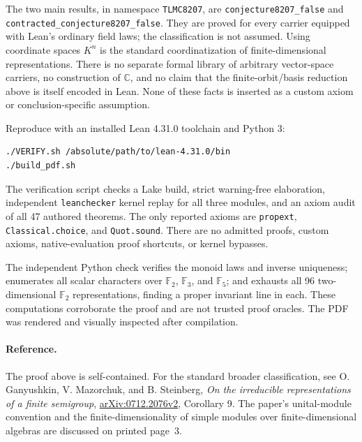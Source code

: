 \documentclass[11pt]{article}
\newcommand{\C}{\mathbb C}
\begin{document}
The two main results, in namespace \texttt{TLMC8207}, are
\texttt{conjecture8207\_false} and \texttt{contracted\_conjecture8207\_false}. They are proved for every carrier equipped with Lean's ordinary field laws; the classification is not assumed. Using coordinate spaces $K^n$ is the standard coordinatization of finite-dimensional representations. There is no separate formal library of arbitrary vector-space carriers, no construction of $\C$, and no claim that the finite-orbit/basis reduction above is itself encoded in Lean. None of these facts is inserted as a custom axiom or conclusion-specific assumption.

Reproduce with an installed Lean 4.31.0 toolchain and Python 3:
\begin{verbatim}
./VERIFY.sh /absolute/path/to/lean-4.31.0/bin
./build_pdf.sh
\end{verbatim}
The verification script checks a Lake build, strict warning-free elaboration, independent \texttt{leanchecker} kernel replay for all three modules, and an axiom audit of all 47 authored theorems. The only reported axioms are \texttt{propext}, \texttt{Classical.choice}, and \texttt{Quot.sound}. There are no admitted proofs, custom axioms, native-evaluation proof shortcuts, or kernel bypasses.

The independent Python check verifies the monoid laws and inverse uniqueness; enumerates all scalar characters over $\mathbb F_2$, $\mathbb F_3$, and $\mathbb F_5$; and exhausts all 96 two-dimensional $\mathbb F_2$ representations, finding a proper invariant line in each. These computations corroborate the proof and are not trusted proof oracles. The PDF was rendered and visually inspected after compilation.

\paragraph{Reference.}
The proof above is self-contained. For the standard broader classification, see O. Ganyushkin, V. Mazorchuk, and B. Steinberg, \emph{On the irreducible representations of a finite semigroup}, \href{https://arxiv.org/abs/0712.2076}{arXiv:0712.2076v2}, Corollary 9. The paper's unital-module convention and the finite-dimensionality of simple modules over finite-dimensional algebras are discussed on printed page~3.
\end{document}

